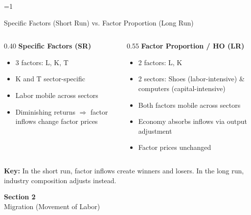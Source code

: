 \documentclass{beamer}
\newcommand{\showanswers}{1}  %
\begin{document}

\ifnum\showanswers=1

\begin{frame}{Specific Factors (Short Run) vs. Factor Proportion (Long Run)}

\begin{columns}[T]
\begin{column}{0.40\textwidth}
\textbf{Specific Factors (SR)}
\begin{itemize}
    \item 3 factors: L, K, T
    \item K and T sector-specific
    \item Labor mobile across sectors
    \item Diminishing returns $\Rightarrow$ factor inflows change factor prices
\end{itemize}
\end{column}

\begin{column}{0.55\textwidth}
\textbf{Factor Proportion / HO (LR)}
\begin{itemize}
    \item 2 factors: L, K
    \item 2 sectors: Shoes (labor-intensive) \& computers (capital-intensive)
    \item Both factors mobile across sectors
    \item Economy absorbs inflows via output adjustment
    \item Factor prices unchanged
\end{itemize}
\end{column}
\end{columns}

\vspace{0.1cm}

\textbf{Key:} In the short run, factor inflows create winners and losers. In the long run, industry composition adjusts instead.

\end{frame}

\fi


\begin{frame}

\vspace{2cm}

\centering
{\LARGE \textbf{Section 2}} \\[0.5cm]
{\Large Migration (Movement of Labor)}

\vfill

\end{frame}
\end{document}
